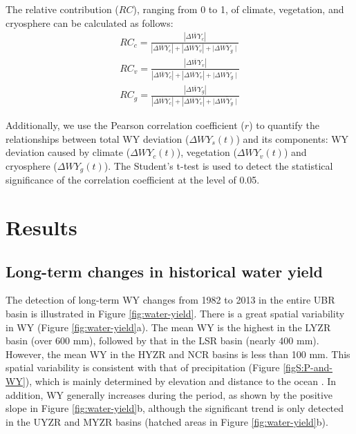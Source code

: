 \documentclass[hess, manuscript]{copernicus}
\begin{document}
The relative contribution ($RC$), ranging from 0 to 1, of climate, vegetation, and cryosphere can be calculated as follows:
\begin{equation}
    \begin{split}
        RC_{c}=\frac{\left|\overline{\Delta WY_{c}}\right|}{\left|\overline{\Delta WY_{c}}\right|+\left|\overline{\Delta WY_{v}}\right|+\mid \overline{\Delta WY_{g} \mid}}\\
        RC_{v}=\frac{\left|\overline{\Delta WY_{v}}\right|}{\left|\overline{\Delta WY_{c}}\right|+\left|\overline{\Delta WY_{v}}\right|+\mid \overline{\Delta WY_{g} \mid}}\\
        RC_{g}=\frac{\left|\overline{\Delta WY_{g}}\right|}{\left|\overline{\Delta WY_{c}}\right|+\left|\overline{\Delta WY_{v}}\right|+\mid \overline{\Delta WY_{g} \mid}}
    \end{split}
\end{equation}

Additionally, we use the Pearson correlation coefficient ($r$) to quantify the relationships between total WY deviation ($\Delta WY_s(t)$) and its components: WY deviation caused by climate ($\Delta WY_c(t)$), vegetation ($\Delta WY_v(t)$) and cryosphere ($\Delta WY_g(t)$).
The Student's t-test is used to detect the statistical significance of the correlation coefficient at the level of 0.05.

\section{Results}
\subsection{Long-term changes in historical water yield}
The detection of long-term WY changes from 1982 to 2013 in the entire UBR basin is illustrated in Figure \ref{fig:water-yield}. There is a great spatial variability in WY (Figure \ref{fig:water-yield}a). The mean WY is the highest in the LYZR basin (over 600 mm), followed by that in the LSR basin (nearly 400 mm). However, the mean WY in the HYZR and NCR basins is less than 100 mm. 
This spatial variability is consistent with that of precipitation (Figure \ref{figS:P-and-WY}), which is mainly determined by elevation and distance to the ocean \citep{sang2016precipitation}.
In addition, WY generally increases during the period, as shown by the positive slope in Figure \ref{fig:water-yield}b, although the significant trend is only detected in the UYZR and MYZR basins (hatched areas in Figure \ref{fig:water-yield}b).
\end{document}
